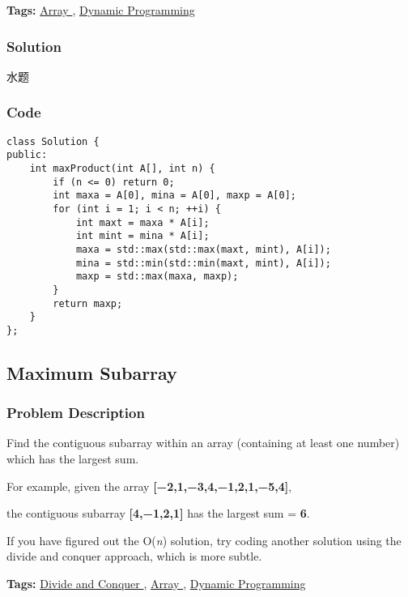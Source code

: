 \documentclass{article}
\begin{document}
\begin{CJK*}{UTF8}{gkai}
\textbf{Tags: }
\hyperref[ Array ]{ Array },  \hyperref[ Dynamic Programming ]{ Dynamic Programming }



\subsubsection*{Solution}
水题

\subsubsection*{Code}
\begin{lstlisting}
class Solution {
public:
    int maxProduct(int A[], int n) {
        if (n <= 0) return 0;
        int maxa = A[0], mina = A[0], maxp = A[0];
        for (int i = 1; i < n; ++i) {
            int maxt = maxa * A[i];
            int mint = mina * A[i];
            maxa = std::max(std::max(maxt, mint), A[i]);
            mina = std::min(std::min(maxt, mint), A[i]);
            maxp = std::max(maxa, maxp);
        }
        return maxp;
    }
}; 
\end{lstlisting}


\subsection{ Maximum Subarray }
\label{ Maximum Subarray }

\subsubsection*{Problem Description}
Find the contiguous subarray within an array (containing at least one number) which has the largest sum.

For example, given the array \textbf{[−2,1,−3,4,−1,2,1,−5,4]},


the contiguous subarray \textbf{[4,−1,2,1]} has the largest sum = \textbf{6}.

If you have figured out the O(\emph{n}) solution, try coding another solution using the divide and conquer approach, which is more subtle.


\textbf{Tags: }
\hyperref[ Divide and Conquer ]{ Divide and Conquer },  \hyperref[ Array ]{ Array },  \hyperref[ Dynamic Programming ]{ Dynamic Programming }




\end{CJK*}
\end{document}
